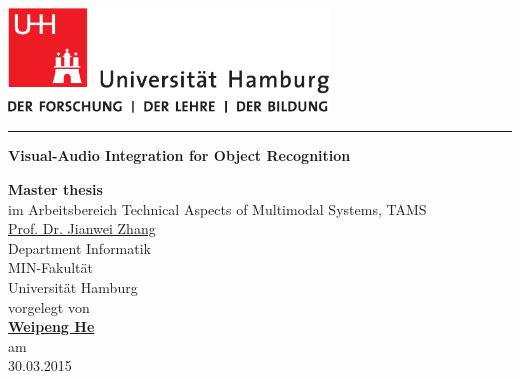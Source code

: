 \documentclass[12pt,final,twoside]{report}
\author{\trauthor}
\makeatletter
\newcommand{\trtitle}{Visual-Audio Integration for Object Recognition}
\newcommand{\trtype}{Master thesis} %
\newcommand{\trauthor}{Weipeng He}
\newcommand{\trauthortitle}{} %
\newcommand{\tremail}{2he@informatik.uni-hamburg.de}
\newcommand{\trgutachterA}{\href{mailto:zhang@informatik.uni-hamburg.de}{Prof. Dr. Jianwei Zhang}}
\newcommand{\trfach}{Technical Aspects of Multimodal Systems, TAMS}
\newcommand{\trdate}{30.03.2015}
\theoremstyle{plain}
\theoremstyle{definition}
\theoremstyle{remark}
\makeatother
\begin{document}
\renewcommand{\headheight}{14.5pt}      %

\thispagestyle{empty}
\fancyhead[LO,RE]{}                     %


\begin{titlepage}
    \begin{flushleft}
        \includegraphics[width=85mm]{uhhLogoL.pdf}\\
    \end{flushleft}
    \rule{\textwidth}{0.4pt}
        \newline
        \vspace{2.0cm}
        \begin{center}
          \LARGE \textbf{\trtitle}
        \end{center}
    \vspace{2.0cm}
    \begin{center}
      \textbf{\trtype}\\
      im Arbeitsbereich \trfach\\
      \trgutachterA\medskip\\
      Department Informatik\\
      MIN-Fakult\"at\\
      Universit\"at Hamburg \\[0.5cm]
      vorgelegt von \\
      \textbf{\trauthortitle\href{mailto:\tremail}{\trauthor}}\\
      am\\
      \trdate
    \end{center}

\end{titlepage}
\end{document}
